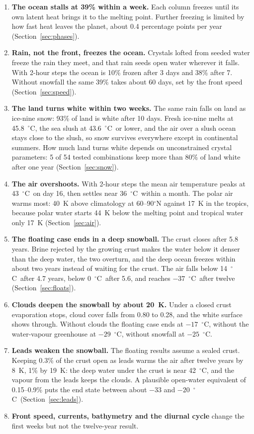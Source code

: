\documentclass[11pt,a4paper]{article}
\newcommand{\degC}{$^{\circ}$C}
\newcommand{\degree}{$^{\circ}$}
\begin{document}
\begin{enumerate}
\item \textbf{The ocean stalls at 39\% within a week.} Each column freezes until its own latent heat brings it to the melting point. Further freezing is limited by how fast heat leaves the planet, about 0.4 percentage points per year (Section~\ref{sec:phases}).
\item \textbf{Rain, not the front, freezes the ocean.} Crystals lofted from seeded water freeze the rain they meet, and that rain seeds open water wherever it falls. With 2-hour steps the ocean is 10\% frozen after 3 days and 38\% after 7. Without snowfall the same 39\% takes about 60 days, set by the front speed (Section~\ref{sec:speed}).
\item \textbf{The land turns white within two weeks.} The same rain falls on land as ice-nine snow: 93\% of land is white after 10 days. Fresh ice-nine melts at 45.8~\degC, the sea slush at 43.6~\degC\ or lower, and the air over a slush ocean stays close to the slush, so snow survives everywhere except in continental summers. How much land turns white depends on unconstrained crystal parameters: 5 of 54 tested combinations keep more than 80\% of land white after one year (Section~\ref{sec:snow}).
\item \textbf{The air overshoots.} With 2-hour steps the mean air temperature peaks at 43~\degC\ on day 16, then settles near 36~\degC\ within a month. The polar air warms most: 40~K above climatology at 60--90\degree N against 17~K in the tropics, because polar water starts 44~K below the melting point and tropical water only 17~K (Section~\ref{sec:air}).
\item \textbf{The floating case ends in a deep snowball.} The crust closes after 5.8 years. Brine rejected by the growing crust makes the water below it denser than the deep water, the two overturn, and the deep ocean freezes within about two years instead of waiting for the crust. The air falls below 14~\degC\ after 4.7 years, below 0~\degC\ after 5.6, and reaches $-37$~\degC\ after twelve (Section~\ref{sec:floats}).
\item \textbf{Clouds deepen the snowball by about 20~K.} Under a closed crust evaporation stops, cloud cover falls from 0.80 to 0.28, and the white surface shows through. Without clouds the floating case ends at $-17$~\degC, without the water-vapour greenhouse at $-29$~\degC, without snowfall at $-25$~\degC.
\item \textbf{Leads weaken the snowball.} The floating results assume a sealed crust. Keeping 0.3\% of the crust open as leads warms the air after twelve years by 8~K, 1\% by 19~K: the deep water under the crust is near 42~\degC, and the vapour from the leads keeps the clouds. A plausible open-water equivalent of 0.15--0.9\% puts the end state between about $-33$ and $-20$~\degC\ (Section~\ref{sec:leads}).
\item \textbf{Front speed, currents, bathymetry and the diurnal cycle} change the first weeks but not the twelve-year result.
\end{enumerate}
\end{document}
